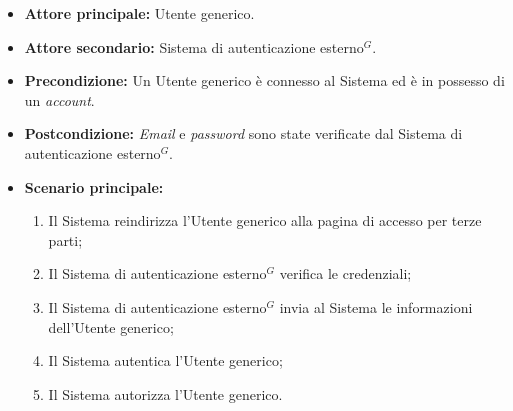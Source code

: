 \label{usecase:Effettua accesso per terze parti}
\begin{itemize}

	\item \textbf{Attore principale:} Utente generico.
	\item \textbf{Attore secondario:} Sistema di autenticazione esterno$^G$.

	\item \textbf{Precondizione:} Un Utente generico è connesso al Sistema ed è in possesso di un \textit{account}.

	\item \textbf{Postcondizione:} \textit{Email} e \textit{password} sono state verificate dal Sistema di autenticazione esterno$^G$.

	\item \textbf{Scenario principale:}
	\begin{enumerate}
		\item Il Sistema reindirizza l'Utente generico alla pagina di accesso per terze parti;
		\item Il Sistema di autenticazione esterno$^G$ verifica le credenziali;
		\item Il Sistema di autenticazione esterno$^G$ invia al Sistema le informazioni dell'Utente generico;
		\item Il Sistema autentica l'Utente generico;
		\item Il Sistema autorizza l'Utente generico.
	\end{enumerate}
	
\end{itemize}